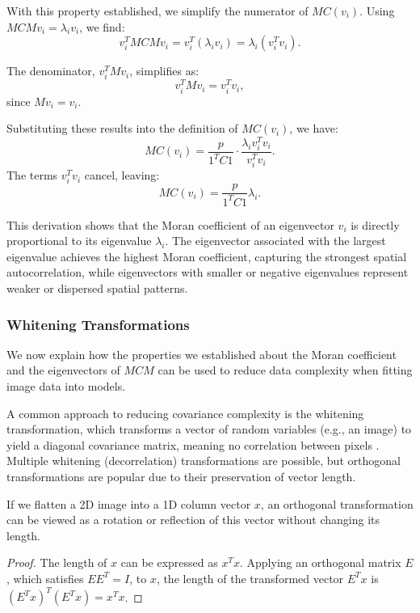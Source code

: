 \documentclass[12pt]{article}
\begin{document}
With this property established, we simplify the numerator of \( MC(v_i) \). Using \( MCM v_i = \lambda_i v_i \), we find:
\[
  v_i^T MCM v_i = v_i^T (\lambda_i v_i) = \lambda_i (v_i^T v_i).
\]

The denominator, \( v_i^T M v_i \), simplifies as:
\[
  v_i^T M v_i = v_i^T v_i,
\]
since \( M v_i = v_i \).

Substituting these results into the definition of \( MC(v_i) \), we have:
\[
  MC(v_i) = \frac{p}{1^T C 1} \cdot \frac{\lambda_i v_i^T v_i}{v_i^T v_i}.
\]
The terms \( v_i^T v_i \) cancel, leaving:
\[
  MC(v_i) = \frac{p}{1^T C 1} \lambda_i.
\]

This derivation shows that the Moran coefficient of an eigenvector \( v_i \) is directly proportional to its eigenvalue \( \lambda_i \). The eigenvector associated with the largest eigenvalue achieves the highest Moran coefficient, capturing the strongest spatial autocorrelation, while eigenvectors with smaller or negative eigenvalues represent weaker or dispersed spatial patterns.


\subsubsection{Whitening Transformations}

We now explain how the properties we established about the Moran coefficient and the eigenvectors of \( M C M \) can be used to reduce data complexity when fitting image data into models.

A common approach to reducing covariance complexity is the whitening transformation, which transforms a vector of random variables (e.g., an image) to yield a diagonal covariance matrix, meaning no correlation between pixels . Multiple whitening (decorrelation) transformations are possible, but orthogonal transformations are popular due to their preservation of vector length.

If we flatten a 2D image into a 1D column vector \( x \), an orthogonal transformation can be viewed as a rotation or reflection of this vector without changing its length.
\begin{proof}
  The length of \( x \) can be expressed as \( x^T x \). Applying an orthogonal matrix \( E \), which satisfies \( E E^T = I \), to \( x \), the length of the transformed vector \( E^T x \) is \( (E^T x)^T (E^T x) = x^T x \).
\end{proof}
\end{document}
